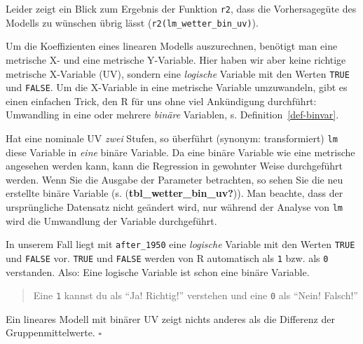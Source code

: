 \documentclass[
  letterpaper,
  oneside,
  open=any]{scrbook}
\theoremstyle{definition}
\theoremstyle{definition}
\theoremstyle{definition}
\theoremstyle{remark}
\begin{document}
Leider zeigt ein Blick zum Ergebnis der Funktion \texttt{r2}, dass die
Vorhersagegüte des Modells zu wünschen übrig lässt
(\texttt{r2(lm\_wetter\_bin\_uv)}).

Um die Koeffizienten eines linearen Modells auszurechnen, benötigt man
eine metrische X- und eine metrische Y-Variable. Hier haben wir aber
keine richtige metrische X-Variable (UV), sondern eine \emph{logische}
Variable mit den Werten \texttt{TRUE} und \texttt{FALSE}. Um die
X-Variable in eine metrische Variable umzuwandeln, gibt es einen
einfachen Trick, den R für uns ohne viel Ankündigung durchführt:
Umwandling in eine oder mehrere \emph{binäre} Variablen, s.
Definition~\ref{def-binvar}.

Hat eine nominale UV \emph{zwei} Stufen, so überführt (synonym:
transformiert) \texttt{lm} diese Variable in \emph{eine} binäre
Variable. Da eine binäre Variable wie eine metrische angesehen werden
kann, kann die Regression in gewohnter Weise durchgeführt werden. Wenn
Sie die Ausgabe der Parameter betrachten, so sehen Sie die neu erstellte
binäre Variable (s. (\textbf{tbl\_wetter\_bin\_uv?})). Man beachte, dass
der ursprüngliche Datensatz nicht geändert wird, nur während der Analyse
von \texttt{lm} wird die Umwandlung der Variable durchgeführt.

In unserem Fall liegt mit \texttt{after\_1950} eine \emph{logische}
Variable mit den Werten \texttt{TRUE} und \texttt{FALSE} vor.
\texttt{TRUE} und \texttt{FALSE} werden von R automatisch als \texttt{1}
bzw. als \texttt{0} verstanden. Also: Eine logische Variable ist schon
eine binäre Variable.

\begin{quote}
{} Eine \texttt{1} kannst du als \enquote{Ja! Richtig!}
verstehen und eine \texttt{0} als \enquote{Nein! Falsch!}
\end{quote}

\begin{tcolorbox}[enhanced jigsaw, bottomrule=.15mm, left=2mm, colbacktitle=quarto-callout-important-color!10!white, bottomtitle=1mm, colframe=quarto-callout-important-color-frame, coltitle=black, rightrule=.15mm, breakable, toptitle=1mm, titlerule=0mm, title=\textcolor{quarto-callout-important-color}{\faExclamation}\hspace{0.5em}{Wichtig}, opacitybacktitle=0.6, arc=.35mm, colback=white, leftrule=.75mm, opacityback=0, toprule=.15mm]

Ein lineares Modell mit binärer UV zeigt nichts anderes als die
Differenz der Gruppenmittelwerte. \(\square\)

\end{tcolorbox}
\end{document}
